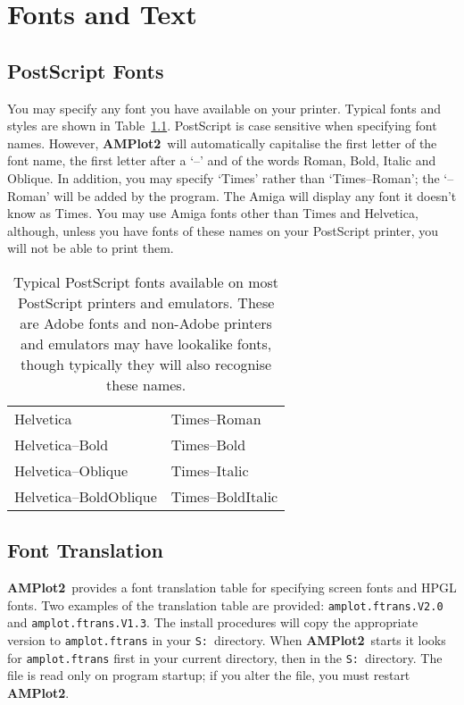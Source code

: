 \documentclass{report}
\newcommand{\amplot}{{\bf AMPlot2}}
\begin{document}
\chapter{Fonts and Text}
\label{ch:fonts}

\section{PostScript Fonts}
You may specify any font you have available on 
your printer. Typical fonts and styles are shown in Table~\ref{tab:fonts}. 
PostScript is case sensitive when specifying font names. However, \amplot\ will
automatically capitalise the first letter of the font name, the first letter after a 
`--' and of the words Roman, 
Bold, Italic and Oblique. In addition, you may specify `Times' rather than
`Times--Roman'; the `--Roman' will be added by the program.
The Amiga will display any font it doesn't know as Times.
You may use Amiga fonts other than Times and Helvetica, although, unless you have 
fonts of these names on your PostScript printer, you will not be able to print 
them.
\begin{table}
\begin{center}
\begin{tabular}{|l|l|} \hline
Helvetica                & Times--Roman        \\
Helvetica--Bold          & Times--Bold         \\
Helvetica--Oblique       & Times--Italic       \\
Helvetica--BoldOblique   & Times--BoldItalic   \\ \hline
\end{tabular}
\end{center}
\caption[Typical PostScript Fonts]{\label{tab:fonts}Typical PostScript fonts 
available on most PostScript printers and emulators. These are Adobe fonts and 
non-Adobe printers and emulators may have lookalike fonts, though typically they 
will also recognise these names.}
\end{table}

\section{Font Translation}
\amplot\ provides a font translation table for specifying 
screen fonts and HPGL
fonts. Two examples of the translation table are provided: {\tt amplot.ftrans.V2.0} 
and {\tt amplot.ftrans.V1.3}. The install procedures will copy the appropriate 
version to {\tt amplot.ftrans} in your {\tt S:}\ directory. When \amplot\ starts it 
looks for {\tt amplot.ftrans} first in your current directory, then in the {\tt S:}\ 
directory. The file is read only on program startup; if you alter the file, you must 
restart \amplot.
\end{document}
